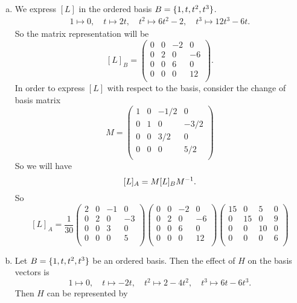 \begin{solution}
	\begin{enumerate}[(a)]
		\item We express $ [L] $ in the ordered basis $ B = \{1,t,t^2,t^3\} $.
		\begin{align*}
			1 \mapsto 0, \quad t\mapsto 2t, \quad t^2 \mapsto 6t^2-2,\quad t^3\mapsto 12t^3 - 6t.
		\end{align*}
		So the matrix representation will be
		\[ 
		[L]_B = \begin{pmatrix}
			0 & 0 & -2 & 0 \\
			0 & 2 & 0 & -6 \\
			0 & 0 & 6 & 0 \\
			0 & 0 & 0 & 12 \\
		\end{pmatrix}.
		 \]
		In order to express $ [L] $ with respect to the basis, consider the change of basis matrix
		\[ M = 
		\begin{pmatrix}
			1 & 0 & -1/2 & 0 \\
			0 & 1 & 0 & -3/2 \\
			0 & 0 & 3/2 & 0 \\
			0 & 0 & 0 & 5/2 \\
		\end{pmatrix}
		 \]
		 So we will have
		\[ [L]_A = M [L]_B M^{-1}. \]
		So
		\[ [L]_A = \frac{1}{30}
		\begin{pmatrix}
			2 & 0 & -1 & 0 \\
			0 & 2 & 0 & -3 \\
			0 & 0 & 3 & 0 \\
			0 & 0 & 0 & 5 \\ 
		\end{pmatrix}
		\begin{pmatrix}
			0 & 0 & -2 & 0 \\
			0 & 2 & 0 & -6 \\
			0 & 0 & 6 & 0 \\
			0 & 0 & 0 & 12 \\
		\end{pmatrix}
		\begin{pmatrix}
			15 & 0 & 5 & 0 \\
			0 & 15 & 0 & 9 \\
			0 & 0 & 10 & 0 \\
			0 & 0 & 0 & 6 \\
		\end{pmatrix}
		 \]
		 
		 
		 \item Let $ B = \{1,t,t^2,t^3\} $ be an ordered basis. Then the effect of $ H $ on the basis vectors is
		 \[ 1\mapsto 0, \quad t\mapsto-2t,\quad t^2\mapsto 2-4t^2,\quad t^3\mapsto 6t-6t^3. \]
		 Then $ H $ can be represented by
		 

\end{enumerate}
\end{solution}
